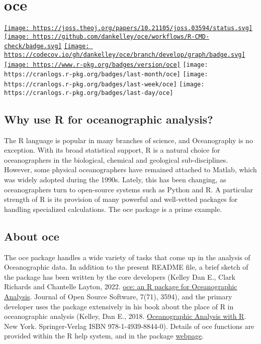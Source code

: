 \documentclass[
]{article}
\author{}
\date{\vspace{-2.5em}}
\begin{document}
\hypertarget{oce}{%
\section{\texorpdfstring{oce }{oce }}\label{oce}}

\href{https://joss.theoj.org/papers/10.21105/joss.03594}{\texttt{[image: https://joss.theoj.org/papers/10.21105/joss.03594/status.svg]}}
\href{https://github.com/dankelley/oce/actions}{\texttt{[image: https://github.com/dankelley/oce/workflows/R-CMD-check/badge.svg]}}
\href{https://app.codecov.io/gh/dankelley/oce?branch=develop}{\texttt{[image: https://codecov.io/gh/dankelley/oce/branch/develop/graph/badge.svg]}}
\href{https://cran.r-project.org/package=oce}{\texttt{[image: https://www.r-pkg.org/badges/version/oce]}}
\texttt{[image: https://cranlogs.r-pkg.org/badges/last-month/oce]}
\texttt{[image: https://cranlogs.r-pkg.org/badges/last-week/oce]}
\texttt{[image: https://cranlogs.r-pkg.org/badges/last-day/oce]}

\hypertarget{why-use-r-for-oceanographic-analysis}{%
\subsection{Why use R for oceanographic
analysis?}\label{why-use-r-for-oceanographic-analysis}}

The R language is popular in many branches of science, and Oceanography
is no exception. With its broad statistical support, R is a natural
choice for oceanographers in the biological, chemical and geological
sub-disciplines. However, some physical oceanographers have remained
attached to Matlab, which was widely adopted during the 1990s. Lately,
this has been changing, as oceanographers turn to open-source systems
such as Python and R. A particular strength of R is its provision of
many powerful and well-vetted packages for handling specialized
calculations. The oce package is a prime example.

\hypertarget{about-oce}{%
\subsection{About oce}\label{about-oce}}

The oce package handles a wide variety of tasks that come up in the
analysis of Oceanographic data. In addition to the present README file,
a brief sketch of the package has been written by the core developers
(Kelley Dan E., Clark Richards and Chantelle Layton, 2022.
\href{https://doi.org/10.21105/joss.03594}{oce: an R package for
Oceanographic Analysis}. Journal of Open Source Software, 7(71), 3594),
and the primary developer uses the package extensively in his book about
the place of R in oceanographic analysis (Kelley, Dan E., 2018.
\href{https://link.springer.com/us/book/9781493988426}{Oceanographic
Analysis with R}. New York. Springer-Verlag ISBN 978-1-4939-8844-0).
Details of oce functions are provided within the R help system, and in
the package \href{https://dankelley.github.io/oce/}{webpage}.
\end{document}
